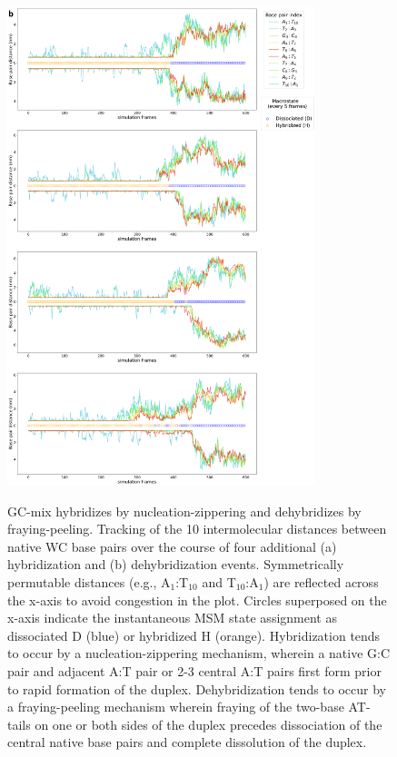 \documentclass[journal=jpcbfk,manuscript=article]{achemso}
\begin{document}
\begin{figure}[ht!]
	\centering
    \includegraphics[width=0.8\textwidth]{FigS5b.pdf}
\end{figure}

\begin{figure}[ht!]
	\centering
    \caption{GC-mix hybridizes by nucleation-zippering and dehybridizes by fraying-peeling. Tracking of the 10 intermolecular distances between native WC base pairs over the course of four additional (a) hybridization and (b) dehybridization events. Symmetrically permutable distances (e.g., A$_1$:T$_{10}$ and T$_{10}$:A$_1$) are reflected across the x-axis to avoid congestion in the plot. Circles superposed on the x-axis indicate the instantaneous MSM state assignment as dissociated D (blue) or hybridized H (orange). Hybridization tends to occur by a nucleation-zippering mechanism, wherein a native G:C pair and adjacent A:T pair or 2-3 central A:T pairs first form prior to rapid formation of the duplex. Dehybridization tends to occur by a fraying-peeling mechanism wherein fraying of the two-base AT-tails on one or both sides of the duplex precedes dissociation of the central native base pairs and complete dissolution of the duplex.}
    \label{fig:SIFig5}
\end{figure}
\end{document}
